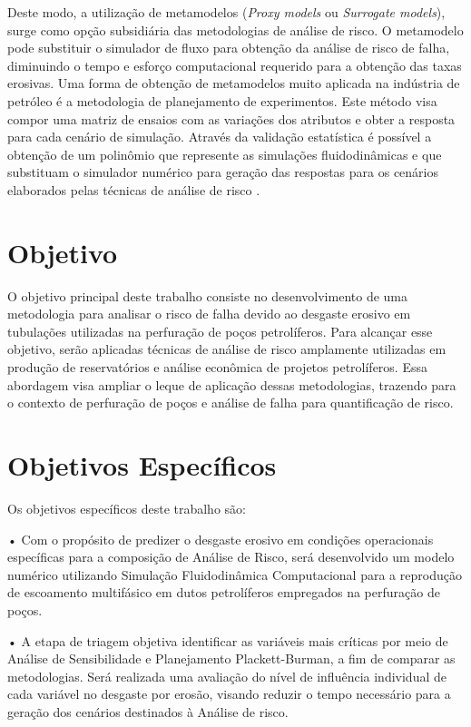 Deste modo, a utilização de metamodelos (\textit{Proxy models} ou \textit{Surrogate models}), surge como opção subsidiária das metodologias de análise de risco. O metamodelo pode substituir o simulador de fluxo para obtenção da análise de risco de falha, diminuindo o tempo e esforço computacional requerido para a obtenção das taxas erosivas. Uma forma de obtenção de metamodelos muito aplicada na indústria de petróleo é a metodologia de planejamento de experimentos. Este método visa compor uma matriz de ensaios com as variações dos atributos e obter a resposta para cada cenário de simulação. Através da validação estatística é possível a obtenção de um polinômio que represente as simulações fluidodinâmicas e que substituam o simulador numérico para geração das respostas para os cenários elaborados pelas técnicas de análise de risco \cite{risso1}.

\section{Objetivo}


    O objetivo principal deste trabalho consiste no desenvolvimento de uma metodologia para analisar o risco de falha devido ao desgaste erosivo em tubulações utilizadas na perfuração de poços petrolíferos. Para alcançar esse objetivo, serão aplicadas técnicas de análise de risco amplamente utilizadas em produção de reservatórios e análise econômica de projetos petrolíferos. Essa abordagem visa ampliar o leque de aplicação dessas metodologias, trazendo para o contexto de perfuração de poços e análise de falha para quantificação de risco.

\section{Objetivos Específicos}   

    Os objetivos específicos deste trabalho são:
    
    • Com o propósito de predizer o desgaste erosivo em condições operacionais específicas para a composição de Análise de Risco, será desenvolvido um modelo numérico utilizando Simulação Fluidodinâmica Computacional para a reprodução de escoamento multifásico em dutos petrolíferos empregados na perfuração de poços.
    
    • A etapa de triagem objetiva identificar as variáveis mais críticas por meio de Análise de Sensibilidade e Planejamento Plackett-Burman, a fim de comparar as metodologias. Será realizada uma avaliação do nível de influência individual de cada variável no desgaste por erosão, visando reduzir o tempo necessário para a geração dos cenários destinados à Análise de risco.
    
